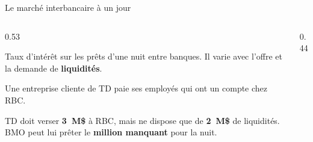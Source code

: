 \documentclass[aspectratio=169]{beamer}
\begin{document}
\begin{frame}[t]{Le marché interbancaire à un jour}\examtag
   \small
   \begin{columns}[T]
      \begin{column}{0.53\textwidth}
         \vspace{0.1cm}
         \begin{defbox}
            \footnotesize\raggedright
            Taux d’intérêt sur les prêts d’une nuit entre banques. Il varie avec l’offre et la demande de \textbf{liquidités}.
         \end{defbox}
         \vspace{0.08cm}
         \begin{keyinsight}
            \footnotesize\raggedright
            Une entreprise cliente de TD paie ses employés qui ont un compte chez RBC.

            \vspace{0.12cm}
            TD doit verser \textbf{3~M\$} à RBC, mais ne dispose que de \textbf{2~M\$} de liquidités. BMO peut lui prêter le \textbf{million manquant} pour la nuit.
         \end{keyinsight}
      \end{column}
      \begin{column}{0.44\textwidth}
         \centering
         \vspace{0.2cm}
         \bankcircle
      \end{column}
   \end{columns}
\end{frame}
\end{document}
